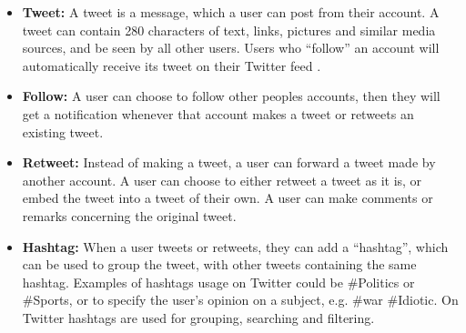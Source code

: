 \begin{itemize}
  \item \textbf{Tweet:} A tweet is a message, which a user can post from their
  account. A tweet can contain 280 characters \citep{Tweet280} of text, links,
  pictures and similar media sources, and be seen by all other users. Users who
  ``follow'' an account will automatically receive its tweet on their Twitter
  feed \citep{StartingTwitter2}.
  \item \textbf{Follow:} A user can choose to follow other peoples accounts,
  then they will get a notification whenever that account makes a tweet or
  retweets an existing tweet.
  \item \textbf{Retweet:} Instead of making a tweet, a user can forward a tweet
  made by another account. A user can choose to either retweet a tweet as it is,
  or embed the tweet into a tweet of their own. A user can make comments or
  remarks concerning the original tweet.
  \item \textbf{Hashtag:} When a user tweets or retweets, they can add a
  ``hashtag'', which can be used to group the tweet, with other tweets
  containing the same hashtag. Examples of hashtags usage on Twitter could be
  \#Politics or \#Sports, or to specify the user's opinion on a subject, e.g.
  \#war \#Idiotic. On Twitter hashtags are used for grouping, searching and
  filtering.
\end{itemize}

